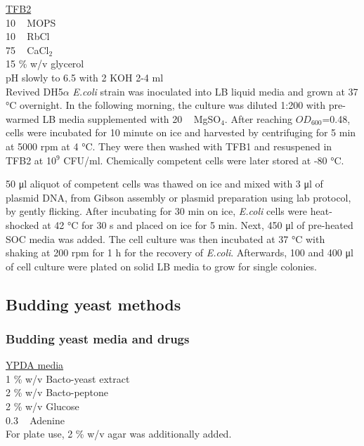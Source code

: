 \underline{TFB2} \\
10 \si{\milli\Molar} MOPS\\
10 \si{\milli\Molar} RbCl\\
75 \si{\milli\Molar} CaCl$_{2}$\\
15 \% w/v glycerol\\
pH slowly to 6.5 with 2 \si{\Molar} KOH 2-4 \si{\milli\litre}\\

Revived DH5$\alpha$ \textit{E.coli} strain was inoculated into LB liquid media and grown at 37 \si{\celsius} overnight. In the following morning, the culture was diluted 1:200 with pre-warmed LB media supplemented with 20 \si{\milli\Molar} MgSO$_{4}$. After reaching $OD_{600}$=0.48, cells were incubated for 10 \si{minute} on ice and harvested by centrifuging for 5 \si{\minute} at 5000 rpm at 4 \si{\celsius}. They were then washed with TFB1 and resuspened in TFB2 at 10$^{9}$ CFU/\si{\milli\litre}. Chemically competent cells were later stored at -80 \si{\celsius}. 

50 \si{\micro\litre} aliquot of competent cells was thawed on ice and mixed with 3 \si{\micro\litre} of plasmid DNA, from Gibson assembly or plasmid preparation using lab protocol, by gently flicking. After incubating for 30 \si{\minute} on ice, \textit{E.coli} cells were heat-shocked at 42 \si{\celsius} for 30 \si{\second} and placed on ice for 5 \si{\minute}. Next, 450 \si{\micro\litre} of pre-heated SOC media was added. The cell culture was then incubated at 37 \si{\celsius} with shaking at 200 rpm for 1 \si{\hour} for the recovery of \textit{E.coli}. Afterwards, 100 and 400 \si{\micro\litre} of cell culture were plated on solid LB media to grow for single colonies. 


\subsection{Budding yeast methods}
\subsubsection{Budding yeast media and drugs}
\underline{YPDA media} \\
1 \% w/v Bacto-yeast extract \\
2 \% w/v Bacto-peptone \\
2 \% w/v Glucose \\
0.3 \si{\milli\Molar} Adenine \\
For plate use, 2 \% w/v agar was additionally added. \\

